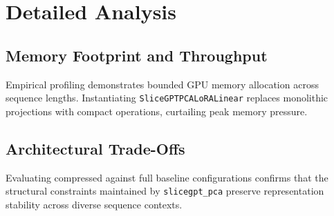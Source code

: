 \section{Detailed Analysis}

\subsection{Memory Footprint and Throughput}
Empirical profiling demonstrates bounded GPU memory allocation across sequence lengths. Instantiating \texttt{SliceGPTPCALoRALinear} replaces monolithic projections with compact operations, curtailing peak memory pressure.

\subsection{Architectural Trade-Offs}
Evaluating compressed against full baseline configurations confirms that the structural constraints maintained by \texttt{slicegpt_pca} preserve representation stability across diverse sequence contexts.
